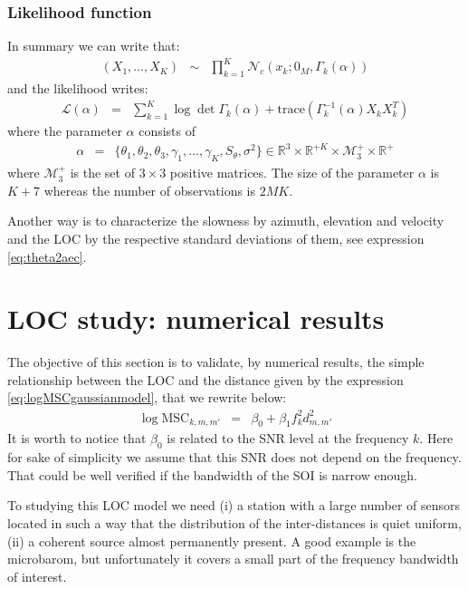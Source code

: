 \documentclass[a4paper, 12pt]{report}
\newcommand{\trace}[1]{\mathrm{trace}\left( #1 \right)}
\def\MSC{\mathrm{MSC}}
\begin{document}
\subsubsection{Likelihood function}
In summary   we can write that:
\begin{eqnarray*}
 (X_{1},\ldots,X_{K}) &\sim&\prod_{k=1}^{K}\mathcal{N}_{c}(x_{k};0_{M},\Gamma_{k}(\alpha))
\end{eqnarray*}
and the likelihood writes:
\begin{eqnarray}
 \label{eq:likelihood-function}
 \mathcal{L}(\alpha)&=&
 \sum_{k=1}^{K}\log\det\Gamma_{k}(\alpha)+\trace{\Gamma_{k}^{-1}(\alpha)X_{k}X_{k}^{T}}
\end{eqnarray}
where the parameter $\alpha$ consists of
\begin{eqnarray}
\alpha&=&
\{
\theta_{1},\theta_{2},\theta_{3},\gamma_{1},\ldots,\gamma_{K},S_{\theta},\sigma^{2}
\}
\in \mathds{R}^{3}\times\mathds{R}^{+K}\times   \mathcal{M}_{3}^{+}\times \mathds{R}^{+}
\end{eqnarray}
where $\mathcal{M}_{3}^{+}$ is the set of $3\times 3$ positive matrices. The size of the parameter $\alpha$ is $K+7$ whereas the number of observations is $2MK$.


Another way is to characterize the slowness by azimuth, elevation and velocity and the LOC by the respective standard deviations of them, see expression \eqref{eq:theta2aec}.
 \section{LOC study: numerical results}
The objective of this section is to validate, by numerical results, the simple relationship between the LOC and the distance given by the expression \eqref{eq:logMSCgaussianmodel}, that we rewrite below:
\begin{eqnarray*}
 \log \MSC_{k,m,m'}&=& \beta_{0}+\beta_{1} f_{k}^2 d_{m,m'}^{2}
\end{eqnarray*}
It is worth to notice that $ \beta_{0}$ is related to the SNR level at the frequency $k$. Here for sake of simplicity we assume that this SNR does not depend on the frequency. That could be well verified if the bandwidth of the SOI is narrow enough.

To studying this LOC model we need (i) a  station with a large number of sensors located in such a way that the distribution of the inter-distances is quiet  uniform, (ii) a coherent source almost permanently present. A good example is the microbarom, but unfortunately it covers a small part of the frequency bandwidth of interest. 
\end{document}
